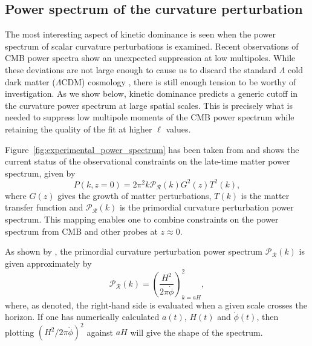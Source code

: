 \subsection{Power spectrum of the curvature perturbation}
\label{sec:powspec}

The most interesting aspect of kinetic dominance is seen when the power spectrum of scalar curvature perturbations is examined. Recent observations of CMB power spectra \citep{hinshaw_nine-year_2012,planck_collaboration_planck_2013} show an unexpected suppression at low multipoles. While these deviations are not large enough to cause us to discard the standard $\Lambda$ cold dark matter ($\Lambda$CDM) cosmology \citep{1998PhRvD..57.2207B,2000PhRvD..62l3513B,2004PhRvD..69f3516D}, there is still enough tension to be worthy of investigation.  As we show below, kinetic dominance predicts a generic cutoff in the curvature power spectrum at large spatial scales. This is precisely what is needed to suppress low multipole moments of the CMB power spectrum while retaining the quality of the fit at higher $\ell$ values.

Figure~\ref{fig:experimental_power_spectrum} has been taken from \citet{hlozek_atacama_2012} and shows the current status of the observational constraints on the late-time matter power spectrum, given by
%
\begin{equation}
  P(k,z=0) = 2\pi^2 k \mathcal{P}_\mathcal{R}(k) G^2(z) T^2(k),
\end{equation}
%
where $G(z)$ gives the growth of matter perturbations, $T(k)$ is the matter transfer function and $\mathcal{P}_\mathcal{R}(k)$ is the primordial curvature perturbation power spectrum. This mapping enables one to combine constraints on the power spectrum from CMB and other probes at $z\approx 0$.




As shown by \citet{liddle_cosmological_2000}, the primordial curvature perturbation power spectrum $\mathcal{P}_{\mathcal{R}}(k)$ is given approximately by
%
\begin{equation}
  \mathcal{P}_{\mathcal{R}}(k)
  =
  {\left(\frac{H^2}{2\pi\dot{\phi}}\right)}^2_{k=a H},
  \label{eqn:curvature_power_spectrum}
\end{equation}
%
where, as denoted, the right-hand side is evaluated when a given scale crosses the horizon. If one has numerically calculated $a(t)$, $H(t)$ and $\dot{\phi}(t)$, then plotting ${\left(H^2/ 2\pi\dot{\phi}\right)}^2$ against $aH$ will give the shape of the spectrum.

